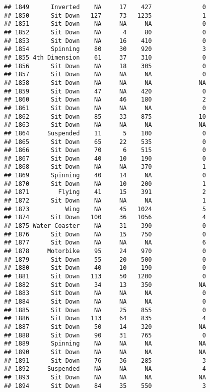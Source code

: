 \documentclass[
]{article}
\begin{document}
\begin{verbatim}
## 1849      Inverted    NA     17    427              0
## 1850      Sit Down   127     73   1235              1
## 1851      Sit Down    NA     NA     NA              0
## 1852      Sit Down    NA      4     80              0
## 1853      Sit Down    NA     16    410              0
## 1854      Spinning    80     30    920              3
## 1855 4th Dimension    61     37    310              0
## 1856      Sit Down    NA     18    305              0
## 1857      Sit Down    NA     NA     NA              0
## 1858      Sit Down    NA     NA     NA             NA
## 1859      Sit Down    47     NA    420              0
## 1860      Sit Down    NA     46    180              2
## 1861      Sit Down    NA     NA     NA              0
## 1862      Sit Down    85     33    875             10
## 1863      Sit Down    NA     NA     NA             NA
## 1864     Suspended    11      5    100              0
## 1865      Sit Down    65     22    535              0
## 1866      Sit Down    70      6    515              0
## 1867      Sit Down    40     10    190              0
## 1868      Sit Down    NA     NA    370              1
## 1869      Spinning    40     14     NA              0
## 1870      Sit Down    NA     10    200              1
## 1871        Flying    41     15    391              2
## 1872      Sit Down    NA     NA     NA              1
## 1873          Wing    NA     45   1024              5
## 1874      Sit Down   100     36   1056              4
## 1875 Water Coaster    NA     31    390              0
## 1876      Sit Down    NA     15    750              0
## 1877      Sit Down    NA     NA     NA              6
## 1878     Motorbike    95     24    970              0
## 1879      Sit Down    55     20    500              0
## 1880      Sit Down    40     10    190              0
## 1881      Sit Down   113     50   1200              0
## 1882      Sit Down    34     13    350             NA
## 1883      Sit Down    NA     NA     NA              0
## 1884      Sit Down    NA     NA     NA              0
## 1885      Sit Down    NA     25    855              0
## 1886      Sit Down   113     64    835              4
## 1887      Sit Down    50     14    320             NA
## 1888      Sit Down    90     31    765              0
## 1889      Spinning    NA     NA     NA             NA
## 1890      Sit Down    NA     NA     NA             NA
## 1891      Sit Down    76     36    285              3
## 1892     Suspended    NA     NA     NA              4
## 1893      Sit Down    NA     NA     NA             NA
## 1894      Sit Down    84     35    550              3

\end{verbatim}
\end{document}
